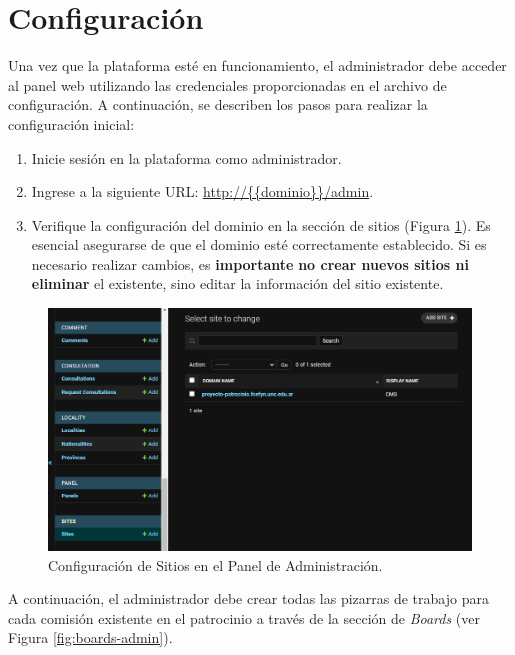 \section{Configuración}

Una vez que la plataforma esté en funcionamiento, el administrador debe acceder al panel web utilizando las credenciales proporcionadas en el archivo de configuración. A continuación, se describen los pasos para realizar la configuración inicial:

\begin{enumerate}
    \item Inicie sesión en la plataforma como administrador.
    \item Ingrese a la siguiente URL: \url{http://{{dominio}}/admin}.
    
    \item Verifique la configuración del dominio en la sección de sitios (Figura \ref{fig:config-sites}). Es esencial asegurarse de que el dominio esté correctamente establecido. Si es necesario realizar cambios, es \textbf{importante}\textbf{ no crear nuevos sitios ni eliminar} el existente, sino editar la información del sitio existente.
\end{enumerate}

\begin{figure}[H]
    \centering
    \includegraphics[width=1\linewidth]{fig/sites.png}
    \caption{Configuración de Sitios en el Panel de Administración.}
    \label{fig:config-sites}
\end{figure}


A continuación, el administrador debe crear todas las pizarras de trabajo para cada comisión existente en el patrocinio a través de la sección de \textit{Boards} (ver Figura \ref{fig:boards-admin}).

